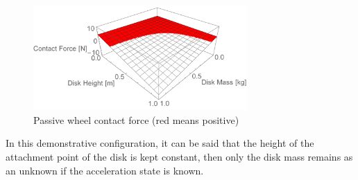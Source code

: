 \documentclass[12pt,english]{article}
\begin{document}
\begin{figure}[htb!]
	\centering
	\includegraphics[height=4cm]{figures/contactForce2D_1}
	\caption{Passive wheel contact force (red means positive)}
	\label{contactForce2D}
\end{figure}


In this demonstrative configuration, it can be said that the height of the attachment point of the disk is kept constant, then only the disk mass remains as an unknown if the acceleration state is known.
\end{document}
